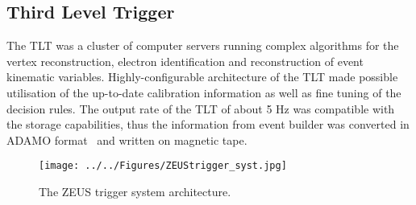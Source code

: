 \subsection{Third Level Trigger}
\label{subsec:tlt}
The TLT was a cluster of computer servers running complex algorithms for the vertex reconstruction, electron identification and reconstruction of event kinematic variables. Highly-configurable architecture of the TLT made possible utilisation of the up-to-date calibration information as well as fine tuning of the decision rules. The output rate of the TLT of about 5 Hz was compatible with the storage capabilities, thus the information from event builder was converted in ADAMO format~\cite{adamo} and written on magnetic tape.

\begin{figure}[h]
	\centering
		\texttt{[image: ../../Figures/ZEUStrigger\_syst.jpg]}
	\caption{The ZEUS trigger system architecture.}
	\label{fig:ZEUStrigger_syst}
\end{figure}
\newpage
